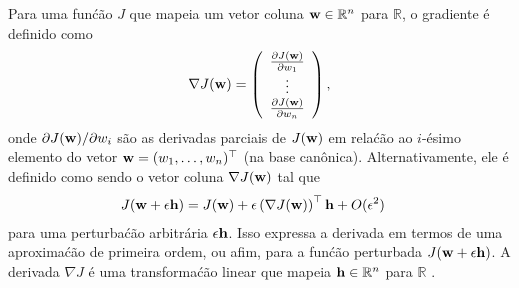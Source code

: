 
\label{ex:grad-vector}
Para uma fun\'c\~ao $J$ que mapeia um vetor coluna $\mathbf{w} \in \mathbb{R}^n$ para $\mathbb{R}$, o gradiente \'e definido como
\begin{equation}
    \nabla J(\w) = \left(
    \begin{array}{c}
        \frac{\partial J(\w)}{\partial w_1} \\ %
        \vdots \\
        \frac{\partial J(\w)}{\partial w_n}
    \end{array} \right),
\end{equation}
onde $\partial J(\mathbf{w})/\partial w_i$ s\~ao as derivadas parciais de $J(\mathbf{w})$ em
rela\'c\~ao ao $i$-\'esimo elemento do vetor $\mathbf{w} = (w_1, \ldots, w_n)^\top$ (na
base can\^onica). Alternativamente, ele \'e definido como sendo o vetor coluna $\nabla J(\mathbf{w})$ tal que
\begin{align}
    J(\mathbf{w}+\epsilon \mathbf{h}) &=  J(\mathbf{w}) + \epsilon \left( \nabla J(\mathbf{w})\right)^\top \mathbf{h}+O(\epsilon^2) \label{eq:grad-vector-alt}
\end{align}
para uma perturba\'c\~ao arbitr\'aria $\epsilon \mathbf{h}$. Isso expressa a derivada em
termos de uma aproxima\'c\~ao de primeira ordem, ou afim, para a fun\'c\~ao perturbada
$J(\mathbf{w}+\epsilon \mathbf{h})$. A derivada $\nabla J$ \'e uma transforma\'c\~ao linear que
mapeia $\mathbf{h} \in \mathbb{R}^n$ para $\mathbb{R}$ \citep[veja, e.g.,][Cap\'itulo 9, para um
tratamento formal de derivadas]{Rudin1976}.

